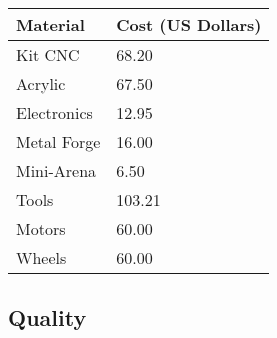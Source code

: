 \documentclass[preprint,12pt,3p]{elsarticle}
\begin{document}
\begin{table}[h!]
    \centering
    \begin{tabular}{|l|l|}
    \hline
    Material    & Cost (US Dollars) \\ \hline
    Kit CNC     & 68.20             \\ \hline
    Acrylic     & 67.50             \\ \hline
    Electronics & 12.95             \\ \hline
    Metal Forge & 16.00             \\ \hline
    Mini-Arena  & 6.50              \\ \hline
    Tools       & 103.21            \\ \hline
    Motors      & 60.00             \\ \hline
    Wheels      & 60.00             \\ \hline
    \end{tabular}
    \end{table}





\bigskip

\subsection{Quality}
\end{document}
